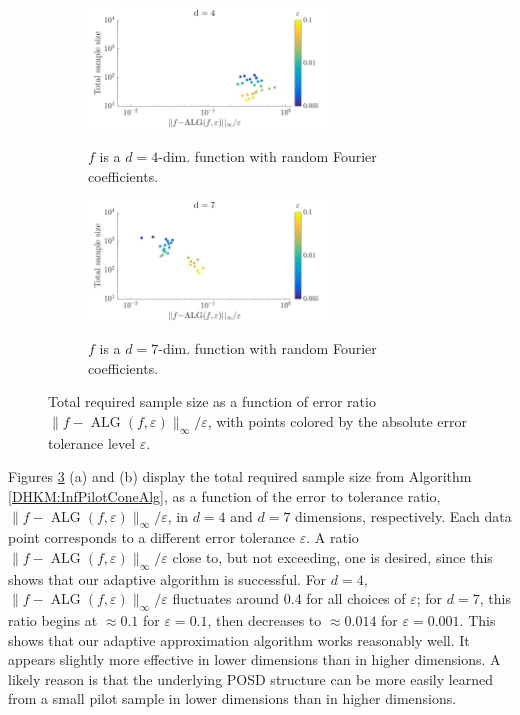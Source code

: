 \documentclass[USenglish]{article}
\theoremstyle{dgthm}
\theoremstyle{dgthm}
\theoremstyle{dgthm}
\theoremstyle{dgthm}
\theoremstyle{dgdef}
\theoremstyle{definition}
\DeclareMathOperator{\DHKMALG}{ALG}
\begin{document}
\begin{figure}[t]
\centering
\begin{subfigure}{\textwidth}
\centering
\includegraphics[width=0.7\textwidth]{d4}
\label{fig:four1}
\caption{$f$ is a $d=4$-dim. function with random Fourier coefficients.}
\end{subfigure}
\begin{subfigure}{\textwidth}
\centering
\includegraphics[width=0.7\textwidth]{d7}
\label{fig:four2}
\caption{$f$ is a $d=7$-dim. function with random Fourier coefficients.}
\end{subfigure}
\caption{Total required sample size as a function of error ratio $\|f - \DHKMALG(f,\varepsilon)\|_{\infty}/\varepsilon$, with points colored by the absolute error tolerance level $\varepsilon$.}
\label{fig:four}
\end{figure}


Figures \ref{fig:four} (a) and (b) display the total required sample size from Algorithm \ref{DHKM:InfPilotConeAlg}, as a function of the error to tolerance ratio, $\|f - \DHKMALG(f,\varepsilon)\|_\infty/\varepsilon$, in $d=4$ and $d=7$ dimensions, respectively. Each data point corresponds to a different error tolerance $\varepsilon$. A ratio $\|f - \DHKMALG(f,\varepsilon)\|_\infty/\varepsilon$ close to, but not exceeding, one is desired, since this shows that our adaptive algorithm is successful. For $d=4$, $\|f - \DHKMALG(f,\varepsilon)\|_\infty/\varepsilon$ fluctuates around 0.4 for all choices of $\varepsilon$; for $d=7$, this ratio begins at $\approx 0.1$ for $\varepsilon = 0.1$, then decreases to $\approx 0.014$ for $\varepsilon = 0.001$. This shows that our adaptive approximation algorithm works reasonably well.  It appears slightly more effective in lower dimensions  than in higher dimensions. A likely reason is that the underlying POSD structure can be more easily learned from a small pilot sample in lower dimensions than in higher dimensions.
\end{document}
